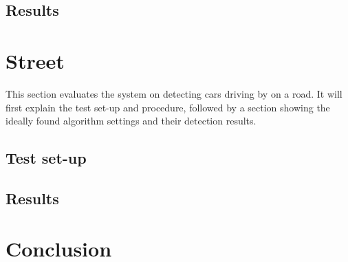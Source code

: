 \subsection{Results}

\section{Street}
This section evaluates the system on detecting cars driving by on a road. It will first explain the test set-up and procedure, followed by a section showing the ideally found algorithm settings and their detection results.
\subsection{Test set-up}
\subsection{Results}

\section{Conclusion}